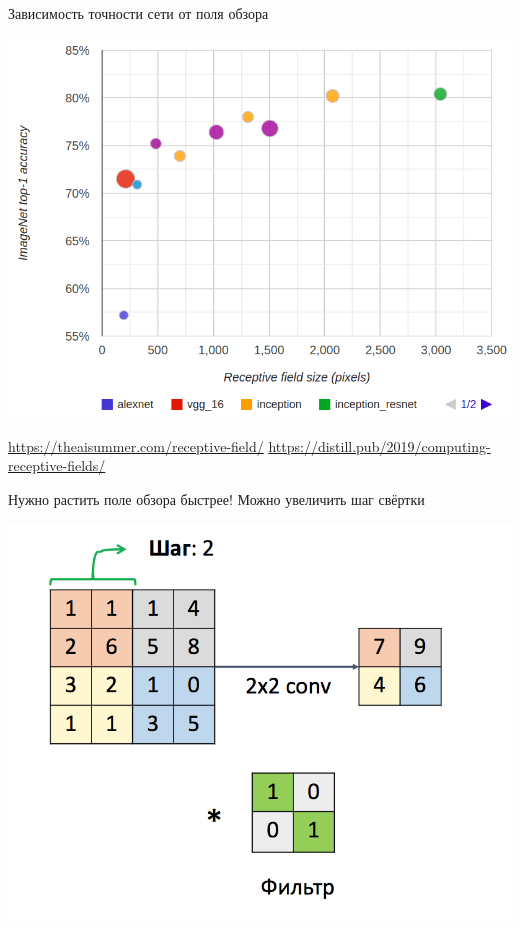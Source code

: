 \documentclass[notes,12pt, aspectratio=169]{beamer}
\begin{document}
\begin{frame}{Зависимость точности сети от поля обзора}
\begin{center}
	\includegraphics[width=.57\linewidth]{imagenet-classification-and-receptive-field.png}
\end{center}
\vfill %
\footnotesize
\color{blue} \url{https://theaisummer.com/receptive-field/} \newline 
\color{blue} \url{https://distill.pub/2019/computing-receptive-fields/}
\end{frame}



\begin{frame}{Нужно растить поле обзора быстрее!}
\vspace{5mm}
\alert{Можно увеличить шаг свёртки}
	\begin{center}
		\includegraphics[width=.6\linewidth]{stride_01.png}
	\end{center}
\end{frame}
\end{document}
